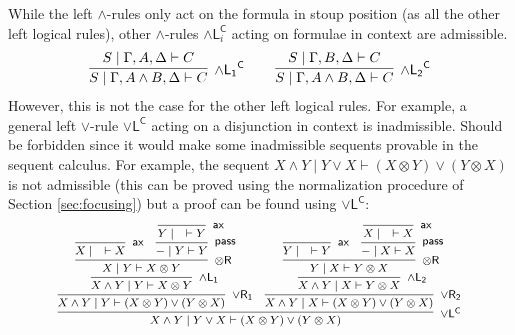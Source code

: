 \documentclass[submission,copyright,creativecommons]{eptcs}
\theoremstyle{definition}
\newcommand{\tr}{\otimes \mathsf{R}}
\newcommand{\pass}{\mathsf{pass}}
\newcommand{\andlone}{\land \mathsf{L_{1}}}
\newcommand{\andltwo}{\land \mathsf{L_{2}}}
\newcommand{\andli}{\land \mathsf{L}_{i}}
\newcommand{\orl}{\lor \mathsf{L}}
\newcommand{\orrone}{\lor \mathsf{R_{1}}}
\newcommand{\orrtwo}{\lor \mathsf{R_{2}}}
\newcommand{\ax}{\mathsf{ax}}
\newcommand{\ot}{\otimes}
\newcommand{\proofbox}[1]{\begin{tabular}{l} #1 \end{tabular}}
\begin{document}
While the left $\land$-rules only act on the formula in stoup position (as all the other left logical rules), other $\land$-rules $\andli^{\mathsf{C}}$ acting on formulae in context are admissible.
  \begin{displaymath}
    \begin{array}{c}
      \proofbox{
        \infer[\andlone^{\mathsf{C}}]{S \mid \Gamma , A \land B , \Delta \vdash C}{
          S \mid \Gamma , A ,\Delta \vdash C
        }
      }
      \quad
      \proofbox{
        \infer[\andltwo^{\mathsf{C}}]{S \mid \Gamma , A \land B , \Delta \vdash C}{
          S \mid \Gamma , B ,\Delta \vdash C
        }
      }
    \end{array}
  \end{displaymath}
However, this is not the case for the other left logical rules. For example, a general left $\lor$-rule $\orl^{\mathsf{C}}$ acting on a disjunction in context is inadmissible. Should be forbidden since it would make some inadmissible sequents provable in the sequent calculus. 
For example, the sequent $X \land Y \mid Y \lor X \vdash (X \ot Y) \lor (Y \ot X)$ is not admissible (this can be proved using the normalization procedure of Section \ref{sec:focusing}) but a proof can be found using $\orl^{\mathsf{C}}$:
\begin{displaymath}
  \footnotesize
  \begin{array}{c}
  \infer[\orl^{\mathsf{C}}]{X \land Y \mid Y \lor X \vdash (X \ot Y) \lor (Y \ot X)}{
    \infer[\orrone]{X \land Y \mid Y \vdash (X \ot Y) \lor (Y \ot X)}{
      \infer[\andlone]{X \land Y \mid Y \vdash X \ot Y}{
        \infer[\tr]{X \mid Y \vdash X \ot Y}{
          \infer[\ax]{X \mid \quad \vdash X}{}
          &
          \infer[\pass]{- \mid Y \vdash Y}{
            \infer[\ax]{Y \mid \quad \vdash Y}{}
          }
        }
      }
    }
    &
    \infer[\orrtwo]{X \land Y \mid X \vdash (X \ot Y) \lor (Y \ot X)}{
      \infer[\andltwo]{X \land Y \mid X \vdash Y \ot X}{
        \infer[\tr]{Y \mid X \vdash Y \ot X}{
          \infer[\ax]{Y \mid \quad \vdash Y}{}
          &
          \infer[\pass]{- \mid X \vdash X}{
            \infer[\ax]{X \mid \quad \vdash X}{}
          }
        }
      }
    }
  }
  \end{array}
\end{displaymath}
\end{document}
